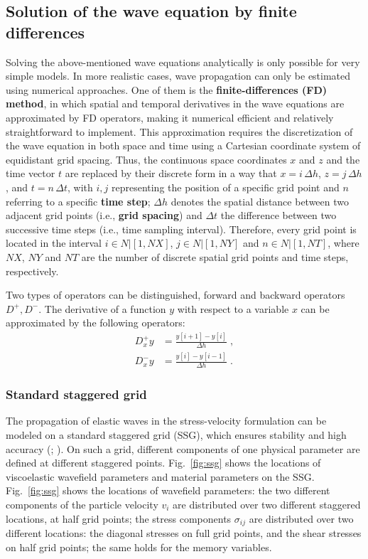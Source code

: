 \subsection{Solution of the wave equation by finite differences}
\label{elastic_FD_Code}
Solving the above-mentioned wave equations analytically is only possible for very simple models. In more realistic cases, wave propagation can only be estimated using numerical approaches. One of them is the \textbf{finite-differences (FD) method}, in which spatial and temporal derivatives in the wave equations are approximated by FD operators, making it numerical efficient and relatively straightforward to implement. This approximation requires the discretization of the wave equation in both space and time using a Cartesian coordinate system of equidistant grid spacing. Thus, the continuous space coordinates $x$ and $z$ and the time vector $t$ are replaced by their discrete form in a way that $x = i\,\Delta h$, $z = j\,\Delta h$, and $t = n\,\Delta t$, with $i,j$ representing the position of a specific grid point and $n$ referring to a specific \textbf{time step}; $\Delta h$ denotes the spatial distance between two adjacent grid points (i.e., \textbf{grid spacing}) and $\Delta t$ the difference between two successive time steps (i.e., time sampling interval). Therefore, every grid point is located in the interval  $i \in N | [1,NX]$, $j \in N | [1,NY]$ and $n \in N | [1,NT]$, where $NX$, $NY$ and $NT$ are the number of discrete spatial grid points and time steps, respectively. 

Two types of operators can be distinguished, forward and backward operators $D^+,D^-$. The derivative of a function $y$ with respect to a variable $x$ can be approximated by the following operators:  
\begin{subequations}
    \begin{align}
        {D^+_x} y &= \frac{y{[i+1]} - {y[i]}}{\Delta h}\;,\\
        {D^-_x} y &= \frac{y{[i]}-y{[i-1]}}{\Delta h}\;.
    \end{align}
    \label{eq:3}
\end{subequations}

\subsubsection{Standard staggered grid}
\label{ssg}
The propagation of elastic waves in the stress-velocity formulation can be modeled on a standard staggered grid (SSG), which ensures stability and high accuracy (\cite{virieux:86}; \cite{levander:88}). On such a grid, different components of one physical parameter are defined at different staggered points. Fig.~\ref{fig:ssg} shows the locations of viscoelastic wavefield parameters and material parameters on the SSG. Fig.~\ref{fig:ssg} shows the locations of wavefield parameters: the two different components of the particle velocity $v_i$ are distributed over two different staggered locations, at half grid points; the stress components $\sigma_{ij}$ are distributed over two different locations: the diagonal stresses on full grid points, and the shear stresses on half grid points; the same holds for the memory variables.

